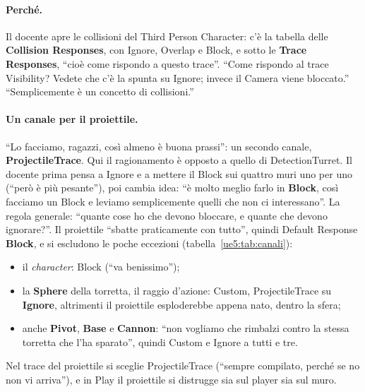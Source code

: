 \paragraph{Perché.} Il docente apre le collisioni del Third Person Character: c'è la
tabella delle \textbf{Collision Responses}, con Ignore, Overlap e Block, e sotto le
\textbf{Trace Responses}, ``cioè come rispondo a questo trace''. ``Come rispondo al trace
Visibility? Vedete che c'è la spunta su Ignore; invece il Camera viene bloccato.''
``Semplicemente è un concetto di collisioni.''

\paragraph{Un canale per il proiettile.} ``Lo facciamo, ragazzi, così almeno è buona
prassi'': un secondo canale, \textbf{ProjectileTrace}. Qui il ragionamento è opposto a
quello di DetectionTurret. Il docente prima pensa a Ignore e a mettere il Block sui
quattro muri uno per uno (``però è più pesante''), poi cambia idea: ``è molto meglio
farlo in \textbf{Block}, così facciamo un Block e leviamo semplicemente quelli che non ci
interessano''. La regola generale: ``quante cose ho che devono bloccare, e quante che
devono ignorare?''. Il proiettile ``sbatte praticamente con tutto'', quindi Default
Response \textbf{Block}, e si escludono le poche eccezioni (tabella~\ref{ue5:tab:canali}):
\begin{itemize}
  \item il \emph{character}: Block (``va benissimo'');
  \item la \textbf{Sphere} della torretta, il raggio d'azione: Custom, ProjectileTrace
        su \textbf{Ignore}, altrimenti il proiettile esploderebbe appena nato, dentro la
        sfera;
  \item anche \textbf{Pivot}, \textbf{Base} e \textbf{Cannon}: ``non vogliamo che
        rimbalzi contro la stessa torretta che l'ha sparato'', quindi Custom e Ignore
        a tutti e tre.
\end{itemize}
Nel trace del proiettile si sceglie ProjectileTrace (``sempre compilato, perché se no non
vi arriva''), e in Play il proiettile si distrugge sia sul player sia sul muro.

